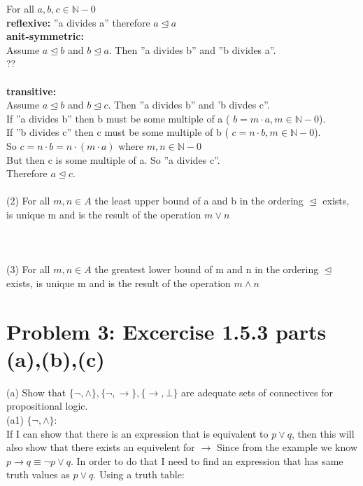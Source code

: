 \documentclass[11pt,leqno,fleqn]{article}
\begin{document}
For all $ a,b,c \in \mathbb{N}-{0}$\\
 \textbf{reflexive:}  ''a divides a'' therefore $  a \trianglelefteq a $\\
 \textbf{anit-symmetric:} \\
Assume  $a \trianglelefteq b$ and $b \trianglelefteq a$. Then ''a divides b'' and ''b divides a''. \\
??\\
  \\
\textbf{transitive:}\\
Assume $a \trianglelefteq b$ and $b \trianglelefteq c$. Then ''a divides b'' and 'b divdes c''.  \\
If ''a divides b'' then b must be some multiple of a ( $ b = m \cdot  a, m \in \mathbb{N}-{0}$).\\ 
If ''b divides c'' then c must be some multiple of b ( $ c = n \cdot  b, m \in \mathbb{N}-{0}$).\\ 
So $c = n \cdot b = n \cdot (m \cdot a) $ where $m,n \in \mathbb{N}-{0}$\\
But then c is some multiple of a. So ''a divides c''.\\
Therefore $ a \trianglelefteq c$.\\
\\
(2) For all $m,n \in A$ the least upper bound of a and b in the ordering $\trianglelefteq$ exists, is unique m and is the result of the operation $m \lor n$\\
\\
\\
\\
(3) For all $m,n \in A$ the greatest lower bound of m and n in the ordering $\trianglelefteq$ exists, is unique m and is the result of the operation $m \land n$\\
% 
%

\section{Problem 3: Excercise 1.5.3 parts (a),(b),(c)}

(a) Show that $\{ \neg{},\land \},\{ \neg{},\to \},\{\to,\bot \}$ are adequate sets of connectives for propositional logic.\\

(a1)   $\{ \neg{},\land \}$:\\
If I can show that there is an expression that is equivalent to $ p \lor q$, then this will also show that there exists an equivelent for $\to$ Since from the example we know $p \to q \equiv \neg{p} \lor q $. In order to do that I need to find an expression that has same truth values as $p \lor q$.
Using a truth table:\\
\end{document}
